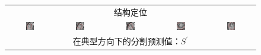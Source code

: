 \begin{figure}
\begin{center}
\begin{tabular}{ccccc}
\multicolumn{5}{c}{结构定位} \\

\includegraphics[width=0.19\textwidth]{./data/representative-results/control/HCMNet_2600035/00_SAX/BASE/0_bbox.png} &
\includegraphics[width=0.19\textwidth]{./data/representative-results/control/HCMNet_2600035/00_SAX/MID/0_bbox.png} &
\includegraphics[width=0.19\textwidth]{./data/representative-results/control/HCMNet_2600035/00_SAX/APEX/0_bbox.png} &
\includegraphics[width=0.19\textwidth]{./data/representative-results/control/HCMNet_1700012/01_HLA/00/0_bbox.png} &
\includegraphics[width=0.19\textwidth]{./data/representative-results/control/HCMNet_1700012/02_VLA/00/0_bbox.png} \\

\multicolumn{5}{c}{在典型方向下的分割预测值：$S^\prime$} \\


\end{tabular}
\end{center}
\end{figure}
